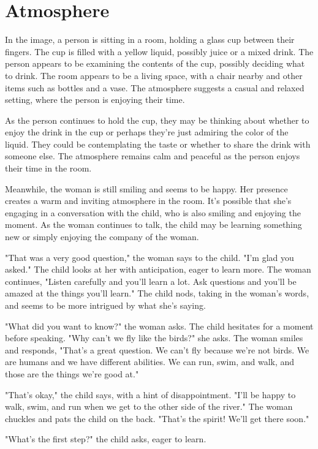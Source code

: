 \documentclass[smalldemyvopaper,11pt,twoside,onecolumn,openright,extrafontsizes]{memoir}
\begin{document}
\chapter{Atmosphere}
In the image, a person is sitting in a room, holding a glass cup between their fingers. The cup is filled with a yellow liquid, possibly juice or a mixed drink. The person appears to be examining the contents of the cup, possibly deciding what to drink. The room appears to be a living space, with a chair nearby and other items such as bottles and a vase. The atmosphere suggests a casual and relaxed setting, where the person is enjoying their time.\par
As the person continues to hold the cup, they may be thinking about whether to enjoy the drink in the cup or perhaps they're just admiring the color of the liquid. They could be contemplating the taste or whether to share the drink with someone else. The atmosphere remains calm and peaceful as the person enjoys their time in the room.\par
Meanwhile, the woman is still smiling and seems to be happy. Her presence creates a warm and inviting atmosphere in the room. It's possible that she's engaging in a conversation with the child, who is also smiling and enjoying the moment. As the woman continues to talk, the child may be learning something new or simply enjoying the company of the woman.\par
"That was a very good question," the woman says to the child. "I'm glad you asked." The child looks at her with anticipation, eager to learn more. The woman continues, "Listen carefully and you'll learn a lot. Ask questions and you'll be amazed at the things you'll learn." The child nods, taking in the woman's words, and seems to be more intrigued by what she's saying.\par
"What did you want to know?" the woman asks. The child hesitates for a moment before speaking. "Why can't we fly like the birds?" she asks. The woman smiles and responds, "That's a great question. We can't fly because we're not birds. We are humans and we have different abilities. We can run, swim, and walk, and those are the things we're good at."\par
"That's okay," the child says, with a hint of disappointment. "I'll be happy to walk, swim, and run when we get to the other side of the river." The woman chuckles and pats the child on the back. "That's the spirit! We'll get there soon."\par
"What's the first step?" the child asks, eager to learn.\par
\end{document}
